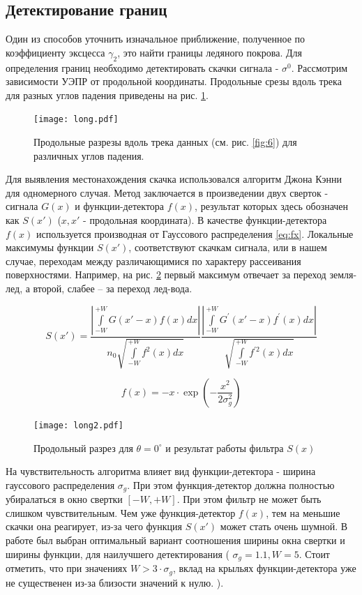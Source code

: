 \subsection{Детектирование границ}
Один из способов уточнить изначальное приближение, полученное по коэффициенту эксцесса $\gamma_2$, это найти границы ледяного покрова.
Для определения границ необходимо детектировать скачки сигнала - $\sigma^0$. Рассмотрим зависимости УЭПР от продольной
координаты. Продольные срезы вдоль трека для разных углов падения приведены на рис. \ref{fig:8}.

\begin{figure}[h!]
  \centering
  \texttt{[image: long.pdf]}
  \caption{Продольные разрезы вдоль трека данных (см. рис. \ref{fig:6}) для различных углов падения.}
  \label{fig:8}
\end{figure}


Для выявления местонахождения скачка использовался алгоритм Джона Кэнни \cite{canny} для одномерного случая. Метод
заключается в произведении двух сверток - сигнала $G(x)$ и функции-детектора $f(x)$, результат которых здесь обозначен
как $S(x')$ ($x,x'$  - продольная координата). В качестве функции-детектора $f(x)$ используется производная
от Гауссового распределения \eqref{eq:fx}.  Локальные максимумы функции $S(x')$,
соответствуют скачкам сигнала, или в нашем случае, переходам
между различающимися по характеру рассеивания поверхностями. Например, на рис. \ref{fig:9} первый максимум отвечает за переход
земля-лед, а второй, слабее – за переход лед-вода. 

\begin{equation}
  S(x') = \frac{\left|\int \limits_{-W}^{+W} G(x'-x) f(x) d x\right|}{n_{0} \sqrt{\int \limits_{-W}^{+W} f^{2}(x) d x}} \frac{\left|\int \limits_{-W}^{+W} G^{\prime}(x'-x) f^{\prime}(x) d x\right|}{\sqrt{\int \limits_{-W}^{+W} f^{\prime 2}(x) d x}}
  \label{eq:S}
\end{equation}

\begin{equation}
  f(x) = -x\cdot \exp(-\frac{x^2}{2\sigma^2_g})
  \label{eq:fx}
\end{equation}


\begin{figure}[h!]
  \centering
  \texttt{[image: long2.pdf]}
  \caption{Продольный разрез для $\theta = 0^{\circ}$ и результат работы фильтра $S(x)$}
  \label{fig:9}
\end{figure}

На чувствительность алгоритма влияет вид функции-детектора - ширина гауссового распределения $\sigma_g$. При этом
функция-детектор должна полностью убиралаться в окно свертки $[-W,+W]$. При этом фильтр не может быть слишком чувствительным. Чем уже
функция-детектор $f(x)$, тем на меньшие скачки она реагирует, из-за чего функция $S(x')$ может стать очень шумной. В
работе был выбран оптимальный вариант соотношения ширины окна свертки и ширины функции, для наилучшего
детектирования ( $\sigma_g = 1.1, W = 5$. Стоит отметить, что при значениях $W>3\cdot \sigma_g$, вклад на крыльях
функции-детектора уже не существенен из-за близости значений к нулю. ). 

